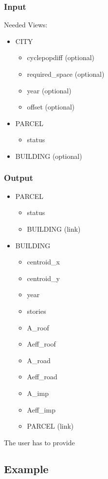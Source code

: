\documentclass{scrartcl}
\begin{document}
\subsubsection{Input}\hypertarget{input}{}\label{input}

Needed Views:

\begin{itemize}
\item CITY


\begin{itemize}
\item cyclepopdiff (optional)
\item required\_space (optional)
\item year (optional)
\item offset (optional)
\end{itemize}
\item PARCEL


\begin{itemize}
\item status
\end{itemize}
\item BUILDING (optional)
\end{itemize}

\subsubsection{Output}\hypertarget{output}{}\label{output}

\begin{itemize}
\item PARCEL


\begin{itemize}
\item status
\item BUILDING (link)
\end{itemize}
\item BUILDING


\begin{itemize}
\item centroid\_x
\item centroid\_y
\item year
\item stories
\item A\_roof
\item Aeff\_roof
\item A\_road
\item Aeff\_road
\item A\_imp
\item Aeff\_imp
\item PARCEL (link)
\end{itemize}
\end{itemize}

The user has to provide 

\subsection{Example}\hypertarget{example}{}\label{example}
\end{document}

